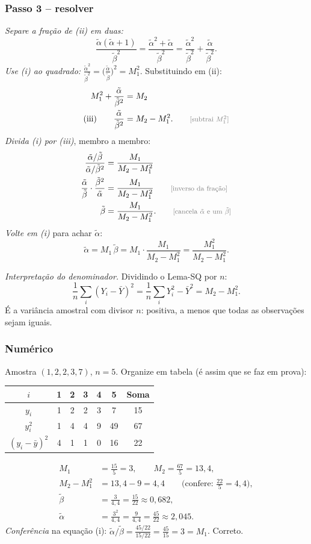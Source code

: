 \documentclass[11pt,a4paper]{article}
\theoremstyle{definition}
\theoremstyle{plain}
\newcommand{\bY}{\bar{Y}}
\newcommand{\just}[1]{\tag*{\footnotesize\textcolor{gray}{[#1]}}}
\begin{document}
\subsubsection*{Passo 3 -- resolver}
\textit{Separe a fração de (ii) em duas:}
\[
\frac{\tilde\alpha(\tilde\alpha+1)}{\tilde\beta^2}=\frac{\tilde\alpha^2+\tilde\alpha}{\tilde\beta^2}=\frac{\tilde\alpha^2}{\tilde\beta^2}+\frac{\tilde\alpha}{\tilde\beta^2}.
\]
\textit{Use (i) ao quadrado:} $\frac{\tilde\alpha^2}{\tilde\beta^2}=\Big(\frac{\tilde\alpha}{\tilde\beta}\Big)^2=M_1^2$. Substituindo em (ii):
\begin{align*}
M_1^2+\frac{\tilde\alpha}{\tilde\beta^2}&=M_2\\
\text{(iii)}\qquad\frac{\tilde\alpha}{\tilde\beta^2}&=M_2-M_1^2 . \just{subtrai $M_1^2$}
\end{align*}
\textit{Divida (i) por (iii)}, membro a membro:
\begin{align*}
\frac{\tilde\alpha/\tilde\beta}{\tilde\alpha/\tilde\beta^2}&=\frac{M_1}{M_2-M_1^2}\\
\frac{\tilde\alpha}{\tilde\beta}\cdot\frac{\tilde\beta^2}{\tilde\alpha}&=\frac{M_1}{M_2-M_1^2} \just{inverso da fração}\\
\tilde\beta&=\frac{M_1}{M_2-M_1^2}. \just{cancela $\tilde\alpha$ e um $\tilde\beta$}
\end{align*}
\textit{Volte em (i)} para achar $\tilde\alpha$:
\[
\tilde\alpha=M_1\,\tilde\beta=M_1\cdot\frac{M_1}{M_2-M_1^2}=\frac{M_1^2}{M_2-M_1^2}.
\]

\textit{Interpretação do denominador.} Dividindo o Lema-SQ por $n$:
\[
\frac1n\sum_i(Y_i-\bY)^2=\frac1n\sum_iY_i^2-\bY^2=M_2-M_1^2 .
\]
É a variância amostral com divisor $n$: positiva, a menos que todas as observações sejam iguais.

\subsubsection*{Numérico}
Amostra $(1,2,2,3,7)$, $n=5$. Organize em tabela (é assim que se faz em prova):
\begin{center}
\begin{tabular}{@{}cccccc|c@{}}
\toprule
$i$ & 1 & 2 & 3 & 4 & 5 & Soma\\
\midrule
$y_i$ & 1 & 2 & 2 & 3 & 7 & 15\\
$y_i^2$ & 1 & 4 & 4 & 9 & 49 & 67\\
$(y_i-\bar y)^2$ & 4 & 1 & 1 & 0 & 16 & 22\\
\bottomrule
\end{tabular}
\end{center}
\begin{align*}
M_1&=\frac{15}{5}=3, \qquad M_2=\frac{67}{5}=13{,}4,\\
M_2-M_1^2&=13{,}4-9=4{,}4 \qquad\Big(\text{confere: }\tfrac{22}{5}=4{,}4\Big),\\
\tilde\beta&=\frac{3}{4{,}4}=\frac{15}{22}\approx0{,}682,\\
\tilde\alpha&=\frac{3^2}{4{,}4}=\frac{9}{4{,}4}=\frac{45}{22}\approx2{,}045 .
\end{align*}
\textit{Conferência} na equação (i): $\tilde\alpha/\tilde\beta=\frac{45/22}{15/22}=\frac{45}{15}=3=M_1$. Correto.
\end{document}
